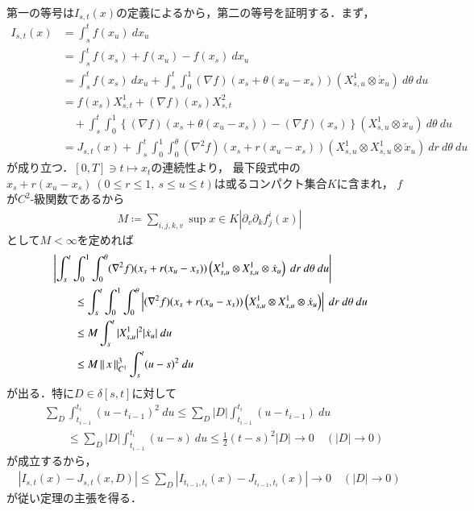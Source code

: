 	\begin{prf}
		第一の等号は$I_{s,t}(x)$の定義によるから，第二の等号を証明する．まず，
		\begin{align}
			I_{s,t}(x)
			&= \int_s^t f(x_u)\ dx_u \\
			&= \int_s^t f(x_s) + f(x_u) - f(x_s)\ dx_u \\
			&= \int_s^t f(x_s)\ dx_u
				+ \int_s^t \int_0^1 (\nabla f)(x_s + \theta(x_u - x_s)) \left( X^1_{s,u} \otimes \dot{x}_u \right)\ d\theta\ du \\
			&= f(x_s)X^1_{s,t} + (\nabla f)(x_s) X^2_{s,t} \\
				&\quad+ \int_s^t \int_0^1 \left\{ (\nabla f)(x_s + \theta(x_u - x_s)) - (\nabla f)(x_s) \right\}\left( X^1_{s,u} \otimes \dot{x}_u \right)\ d\theta\ du \\
			&= J_{s,t}(x)
				+ \int_s^t 
				\int_0^1 \int_0^\theta (\nabla^2 f)(x_s + r(x_u - x_s))\left( X^1_{s,u} \otimes X^1_{s,u} \otimes \dot{x}_u \right)\ dr\ d\theta\ du
		\end{align}
		が成り立つ．$[0,T] \ni t \longmapsto x_t$の連続性より，
		最下段式中の$x_s + r(x_u - x_s)\ (0 \leq r \leq 1,\ s \leq u \leq t)$は或るコンパクト集合$K$に含まれ，
		$f$が$C^2$-級関数であるから
		\begin{align}
			M \coloneqq \sum_{i,j,k,v} \sup{x \in K}{\left|\partial_v \partial_k f_j^i(x) \right|}
		\end{align}
		として$M < \infty$を定めれば
		\begin{align}
			&\left| \int_s^t 
				\int_0^1 \int_0^\theta (\nabla^2 f)(x_s + r(x_u - x_s))\left( X^1_{s,u} \otimes X^1_{s,u} \otimes \dot{x}_u \right)\ dr\ d\theta\ du \right| \\
			&\qquad \leq \int_s^t 
				\int_0^1 \int_0^\theta \left| (\nabla^2 f)(x_s + r(x_u - x_s))\left( X^1_{s,u} \otimes X^1_{s,u} \otimes \dot{x}_u \right) \right|\ dr\ d\theta\ du \\
			&\qquad \leq M \int_s^t |X^1_{s,u}|^2 |\dot{x}_u|\ du \\
			&\qquad \leq M \Norm{x}{C^1}^3 \int_s^t (u - s)^2\ du
		\end{align}
		が出る．特に$D \in \delta[s,t]$に対して
		\begin{align}
			&\sum_D \int_{t_{i-1}}^{t_i} (u - t_{i-1})^2\ du
			\leq \sum_D |D| \int_{t_{i-1}}^{t_i} (u - t_{i-1})\ du \\
			&\qquad \leq \sum_D |D| \int_{t_{i-1}}^{t_i} (u - s)\ du
			\leq \frac{1}{2}(t-s)^2 |D|
			\longrightarrow 0 \quad (|D| \longrightarrow 0)
		\end{align}
		が成立するから，
		\begin{align}
			\left| I_{s,t}(x) - J_{s,t}(x,D) \right|
			\leq \sum_D \left| I_{t_{i-1},t_i}(x) - J_{t_{i-1},t_i}(x) \right| \longrightarrow 0 \quad (|D| \longrightarrow 0)
		\end{align}
		が従い定理の主張を得る．
		\QED
	\end{prf}
	
